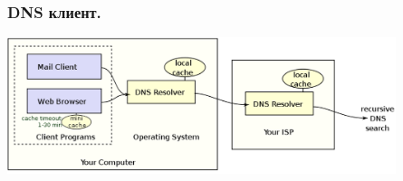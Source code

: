 \begin{frame}
  \frametitle{DNS клиент.}
\includegraphics[height=4cm]{../../slides/dns/images/dns_resolver.png}
\end{frame}
